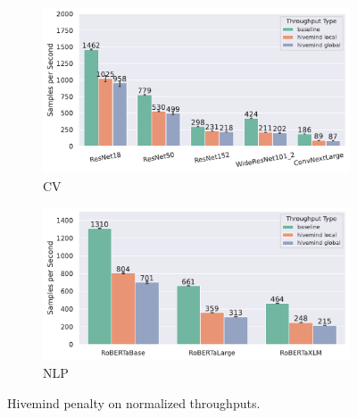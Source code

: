 \begin{figure} 
    \begin{subfigure}[c]{0.238\textwidth} 
        \includegraphics[width=\textwidth]{figures/misc/cv_2xa10_32768_hivemind_local_sps}
        \vspace{-20pt}  
        \caption{CV}
        \label{fig:cv-2xa10-local-sps}
    \end{subfigure} 
    \begin{subfigure}[c]{0.23\textwidth}
        \includegraphics[width=\textwidth]{figures/misc/nlp_2xa10_32768_hivemind_local_sps}
        \vspace{-15pt}
        \caption{NLP}
        \label{fig:nlp-2xa10-local-sps}   
    \end{subfigure}
    \vspace{-13pt}
    \caption{Hivemind penalty on normalized throughputs.}
    \label{fig:hivemind-penalty-analysis}
    \vspace*{-5mm}
\end{figure}

